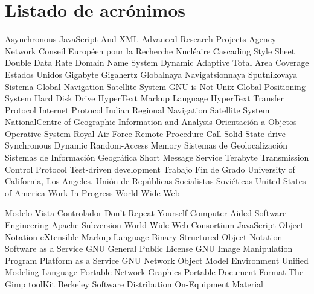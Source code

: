 \chapter{Listado de acrónimos}

{\small
\begin{acronym}[XXXXXXXX]
	         {Asynchronous JavaScript And XML}
	        {Advanced Research Projects Agency Network}
	           {Conseil Européen pour la Recherche Nucléaire}
	            {Cascading Style Sheet}
	            {Double Data Rate}
	            {Domain Name System}
	        {Dynamic Adaptive Total Area Coverage}
	         {Estados Unidos}
	             {Gigabyte}
	            {Gigahertz}
	        {Globalnaya Navigatsionnaya Sputnikovaya Sistema}
	           {Global Navigation Satellite System}
	            {\acs{GNU} is Not Unix}
	            {Global Positioning System}
	            {Hard Disk Drive}
	           {HyperText Markup Language}
	           {HyperText Transfer Protocol}
	             {Internet Protocol}
	          {Indian Regional Navigation Satellite System}
	          {NationalCentre of Geographic Information and Analysis}
	             {Orientación a Objetos}
	             {Operative System}
	            {Royal Air Force}
	            {Remote Procedure Call}
	            {Solid-State drive}
	          {Synchronous Dynamic Random-Access Memory}
	             {Sistemas de Geolocalización}
	            {Sistemas de Información Geográfica}
	            {Short Message Service}
	             {Terabyte}
	            {Transmission Control Protocol}
	            {Test-driven development}
	            {Trabajo Fin de Grado}
	           {University of California, Los Angeles}.
	           {Unión de Repúblicas Socialistas Soviéticas}
	            {United States of America}
	            {Work In Progress}
	            {World Wide Web}
	
			{Modelo Vista Controlador}
			{Don't Repeat Yourself}
			{Computer-Aided Software Engineering}
			{Apache Subversion}
			{World Wide Web Consortium}
			{JavaScript Object Notation}
			{eXtensible Markup Language}
			{Binary Structured Object Notation}
			{Software as a Service}
			{\acs{GNU} General Public License}
			{\acs{GNU} Image Manipulation Program} 
			{Platform as a Service}
		{GNU Network Object Model Environment}
			{Unified Modeling Language}
			{Portable Network Graphics}
			{Portable Document Format}
			{The Gimp toolKit}
			{Berkeley Software Distribution}
			{On-Equipment Material}
\end{acronym}
}


